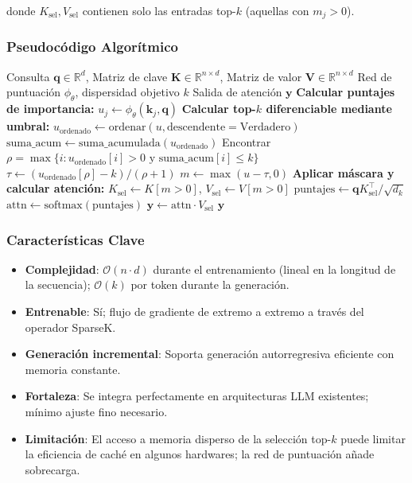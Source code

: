 \documentclass[11pt,a4paper]{article}
\begin{document}
donde $K_{\text{sel}}, V_{\text{sel}}$ contienen solo las entradas top-$k$ (aquellas con $m_j > 0$).

\subsubsection{Pseudocódigo Algorítmico}

\begin{algorithm}[H]
\caption{SparseK: Atención Top-$k$ Diferenciable}
\begin{algorithmic}[1]
\Require Consulta $\mathbf{q} \in \mathbb{R}^d$, Matriz de clave $\mathbf{K} \in \mathbb{R}^{n \times d}$, Matriz de valor $\mathbf{V} \in \mathbb{R}^{n \times d}$
\Require Red de puntuación $\phi_\theta$, dispersidad objetivo $k$
\Ensure Salida de atención $\mathbf{y}$
\State \textbf{Calcular puntajes de importancia:}
    \State $u_j \gets \phi_\theta(\mathbf{k}_j, \mathbf{q})$
\EndFor
\State \textbf{Calcular top-$k$ diferenciable mediante umbral:}
\State $u_{\text{ordenado}} \gets \text{ordenar}(u, \text{descendente}=\text{Verdadero})$
\State $\text{suma\_acum} \gets \text{suma\_acumulada}(u_{\text{ordenado}})$
\State Encontrar $\rho = \max\{i : u_{\text{ordenado}}[i] > 0 \text{ y suma\_acum}[i] \leq k\}$
\State $\tau \gets (u_{\text{ordenado}}[\rho] - k) / (\rho + 1)$ 
\State $m \gets \max(u - \tau, 0)$ 
\State \textbf{Aplicar máscara y calcular atención:}
\State $K_{\text{sel}} \gets K[m > 0]$, $V_{\text{sel}} \gets V[m > 0]$
\State $\text{puntajes} \gets \mathbf{q} K_{\text{sel}}^\top / \sqrt{d_k}$
\State $\text{attn} \gets \text{softmax}(\text{puntajes})$
\State $\mathbf{y} \gets \text{attn} \cdot V_{\text{sel}}$
\Return $\mathbf{y}$
\end{algorithmic}
\end{algorithm}

\subsubsection{Características Clave}

\begin{itemize}[leftmargin=*]
    \item \textbf{Complejidad}: $\mathcal{O}(n \cdot d)$ durante el entrenamiento (lineal en la longitud de la secuencia); $\mathcal{O}(k)$ por token durante la generación.
    \item \textbf{Entrenable}: Sí; flujo de gradiente de extremo a extremo a través del operador SparseK.
    \item \textbf{Generación incremental}: Soporta generación autorregresiva eficiente con memoria constante.
    \item \textbf{Fortaleza}: Se integra perfectamente en arquitecturas LLM existentes; mínimo ajuste fino necesario.
    \item \textbf{Limitación}: El acceso a memoria disperso de la selección top-$k$ puede limitar la eficiencia de caché en algunos hardwares; la red de puntuación añade sobrecarga.
\end{itemize}
\end{document}
